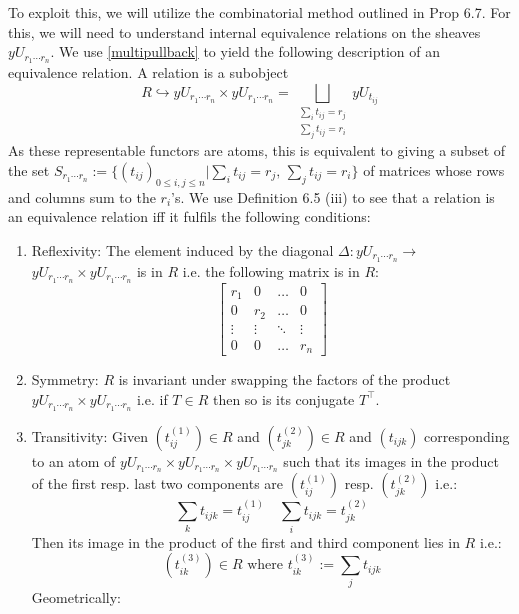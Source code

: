 \documentclass[a4paper]{amsproc}
\theoremstyle{plain}
\theoremstyle{definition}
\theoremstyle{remark}
\numberwithin{equation}{section}
\begin{document}
To exploit this, we will utilize the combinatorial method outlined in \cite{caramello_lafforgue} Prop 6.7. For this, we will need to understand internal equivalence relations on the sheaves $yU_{r_1\cdots r_n}$. We use \ref{multipullback} to yield the following description of an equivalence relation. \newline
\indent A relation is a subobject 
\[R\hookrightarrow yU_{r_1\cdots r_n}\times yU_{r_1\cdots r_n}=\bigsqcup_{\substack{\sum_i t_{ij}=r_j \\ \sum_j t_{ij}=r_i}  }yU_{t_{ij}}\]
As these representable functors are atoms, this is equivalent to giving a subset of the set $S_{r_1\cdots r_n}:=\{(t_{ij})_{0\leq i,j \leq n} | \sum_i t_{ij}=r_j,\, \sum_j t_{ij}=r_i \}$ of matrices whose rows and columns sum to the $r_i$'s. We use Definition 6.5 (iii) \cite{caramello_lafforgue} to see that a relation is an equivalence relation iff it fulfils the following conditions:
\begin{enumerate}
\item Reflexivity:  The element induced by the diagonal $\Delta: yU_{r_1\cdots r_n}\rightarrow $\linebreak $ yU_{r_1\cdots r_n}\times yU_{r_1\cdots r_n}$ is in $R$ i.e. the following matrix is in $R$:
\[ \begin{bmatrix}
    r_{1}       & 0 & \dots & 0 \\
    0      & r_2 &  \dots &0 \\
    \vdots & \vdots &  \ddots& \vdots\\
    0       & 0& \dots & r_n
\end{bmatrix} \] 
\item Symmetry: $R$ is invariant under swapping the factors of the product $ yU_{r_1\cdots r_n}\times yU_{r_1\cdots r_n}$ i.e. if $T\in R$ then so is its conjugate $T^\top$.
\item Transitivity: Given $(t^{(1)}_{ij})\in R$ and $(t^{(2)}_{jk})\in R$ and $(t_{ijk})$ corresponding to an atom of $yU_{r_1\cdots r_n}\times yU_{r_1\cdots r_n} \times yU_{r_1\cdots r_n}$ such that its images in the product of the first resp. last two components are $(t^{(1)}_{ij})$ resp. $(t^{(2)}_{jk})$ i.e.:
\[\sum_k t_{ijk}=t^{(1)}_{ij} \quad \sum_i t_{ijk}=t^{(2)}_{jk} \]
Then its image in the product of the first and third component lies in $R$ i.e.:
\[(t^{(3)}_{ik})\in R \text{ where }t^{(3)}_{ik}:=\sum_j t_{ijk}    \]
Geometrically:
\end{enumerate}
\end{document}

